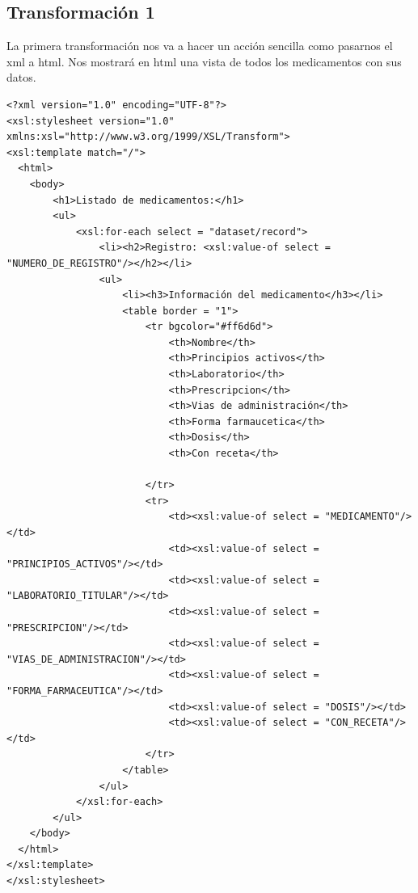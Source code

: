 \documentclass[../main.tex]{subfiles}
\begin{document}
\subsection{Transformación 1}

La primera transformación nos va a hacer un acción sencilla como pasarnos el xml a html. Nos mostrará en html una vista de todos los medicamentos con sus datos.
\lstset{language=XML}
\begin{lstlisting}
<?xml version="1.0" encoding="UTF-8"?>
<xsl:stylesheet version="1.0"
xmlns:xsl="http://www.w3.org/1999/XSL/Transform">
<xsl:template match="/">
  <html>
    <body>
        <h1>Listado de medicamentos:</h1>
        <ul>
            <xsl:for-each select = "dataset/record">
                <li><h2>Registro: <xsl:value-of select = "NUMERO_DE_REGISTRO"/></h2></li>
                <ul>
                    <li><h3>Información del medicamento</h3></li>
                    <table border = "1">
                        <tr bgcolor="#ff6d6d">
                            <th>Nombre</th>
                            <th>Principios activos</th>
                            <th>Laboratorio</th>
                            <th>Prescripcion</th>
                            <th>Vias de administración</th>
                            <th>Forma farmaucetica</th>
                            <th>Dosis</th>
                            <th>Con receta</th>
                            
                        </tr>
                        <tr>
                            <td><xsl:value-of select = "MEDICAMENTO"/></td>
                            <td><xsl:value-of select = "PRINCIPIOS_ACTIVOS"/></td>
                            <td><xsl:value-of select = "LABORATORIO_TITULAR"/></td>
                            <td><xsl:value-of select = "PRESCRIPCION"/></td>
                            <td><xsl:value-of select = "VIAS_DE_ADMINISTRACION"/></td>
                            <td><xsl:value-of select = "FORMA_FARMACEUTICA"/></td>
                            <td><xsl:value-of select = "DOSIS"/></td>
                            <td><xsl:value-of select = "CON_RECETA"/></td>
                        </tr>
                    </table>
                </ul>
            </xsl:for-each>
        </ul>
    </body>
  </html>
</xsl:template>
</xsl:stylesheet>
\end{lstlisting}
\end{document}
